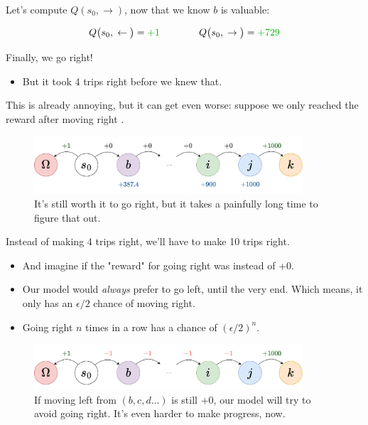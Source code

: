         Let's compute $Q(s_0,\rightarrow)$, now that we know $b$ is valuable:

        \begin{equation}
            Q\big(s_0,\; \leftarrow\big)=\grn{+1} \qquad \qquad Q\big(s_0,\; \rightarrow\big)=\grn{+729}
        \end{equation}

        Finally, we go right!

        \begin{itemize}
            \item But it took 4 trips right before we knew that.
        \end{itemize}

        This is already annoying, but it can get even worse: suppose we only reached the reward after moving right .

        \begin{figure}[H]
            \centering
            \includegraphics[width=100mm,scale=0.5]{images/rl_images/long_hallway.png}
            \caption*{It's still worth it to go right, but it takes a painfully long time to figure that out.}
        \end{figure}

        Instead of making 4 trips right, we'll have to make 10 trips right.

        \begin{itemize}
            \item And imagine if the "reward" for going right was  instead of +0.
            \item Our model would \textit{always} prefer to go left, until the very end. Which means, it only has an $\epsilon/2$ chance of moving right.

            \item Going right $n$ times in a row has a chance of $(\epsilon/2)^n$. 
        \end{itemize}

        \begin{figure}[H]
            \centering
            \includegraphics[width=100mm,scale=0.5]{images/rl_images/painful_hallway.png}
            \caption*{If moving left from $(b,c,d...)$ is still $+0$, our model will try to avoid going right. It's even harder to make progress, now.}
        \end{figure}

